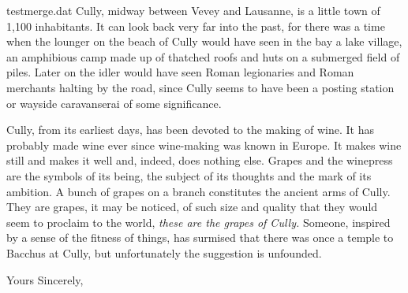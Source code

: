 \documentclass[12pt,english,signit]{hletter}
\date{Lausanne, le 15 septembre 2008}
\begin{document}


\begin{merge}{testmerge.dat}
Cully, midway between Vevey and Lausanne, is a little town of 1,100
inhabitants. It can look back very far into the past, for there was a
time when the lounger on the beach of Cully would have seen in the bay
a lake village, an amphibious camp made up of thatched roofs and huts
on a submerged field of piles. Later on the idler would have seen Roman
legionaries and Roman merchants halting by the road, since Cully seems
to have been a posting station or wayside caravanserai of some
significance.

Cully, from its earliest days, has been devoted to the making of wine.
It has probably made wine ever since wine-making was known in Europe.
It makes wine still and makes it well and, indeed, does nothing else.
Grapes and the winepress are the symbols of its being, the subject of
its thoughts and the mark of its ambition. A bunch of grapes on a
branch constitutes the ancient arms of Cully. They are grapes, it may
be noticed, of such size and quality that they would seem to proclaim
to the world, \emph{these are the grapes of Cully.}  Someone, inspired
by a sense of the fitness of things, has surmised that there was once a
temple to Bacchus at Cully, but unfortunately the suggestion is
unfounded.

 \closing{Yours Sincerely,}

\vfill
{}


\end{merge}
\end{document}
